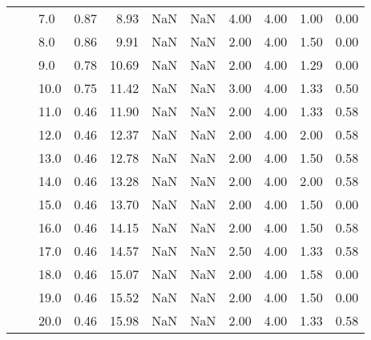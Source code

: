 \begin{tabular}{lllrrrrrrrr}
       &     & 7.0  &      0.87 &       8.93 &               NaN &                NaN & 4.00 &   4.00 &             1.00 &                         0.00 \\
       &     & 8.0  &      0.86 &       9.91 &               NaN &                NaN & 2.00 &   4.00 &             1.50 &                         0.00 \\
       &     & 9.0  &      0.78 &      10.69 &               NaN &                NaN & 2.00 &   4.00 &             1.29 &                         0.00 \\
       &     & 10.0 &      0.75 &      11.42 &               NaN &                NaN & 3.00 &   4.00 &             1.33 &                         0.50 \\
       &     & 11.0 &      0.46 &      11.90 &               NaN &                NaN & 2.00 &   4.00 &             1.33 &                         0.58 \\
       &     & 12.0 &      0.46 &      12.37 &               NaN &                NaN & 2.00 &   4.00 &             2.00 &                         0.58 \\
       &     & 13.0 &      0.46 &      12.78 &               NaN &                NaN & 2.00 &   4.00 &             1.50 &                         0.58 \\
       &     & 14.0 &      0.46 &      13.28 &               NaN &                NaN & 2.00 &   4.00 &             2.00 &                         0.58 \\
       &     & 15.0 &      0.46 &      13.70 &               NaN &                NaN & 2.00 &   4.00 &             1.50 &                         0.00 \\
       &     & 16.0 &      0.46 &      14.15 &               NaN &                NaN & 2.00 &   4.00 &             1.50 &                         0.58 \\
       &     & 17.0 &      0.46 &      14.57 &               NaN &                NaN & 2.50 &   4.00 &             1.33 &                         0.58 \\
       &     & 18.0 &      0.46 &      15.07 &               NaN &                NaN & 2.00 &   4.00 &             1.58 &                         0.00 \\
       &     & 19.0 &      0.46 &      15.52 &               NaN &                NaN & 2.00 &   4.00 &             1.50 &                         0.00 \\
       &     & 20.0 &      0.46 &      15.98 &               NaN &                NaN & 2.00 &   4.00 &             1.33 &                         0.58 \\

\end{tabular}
